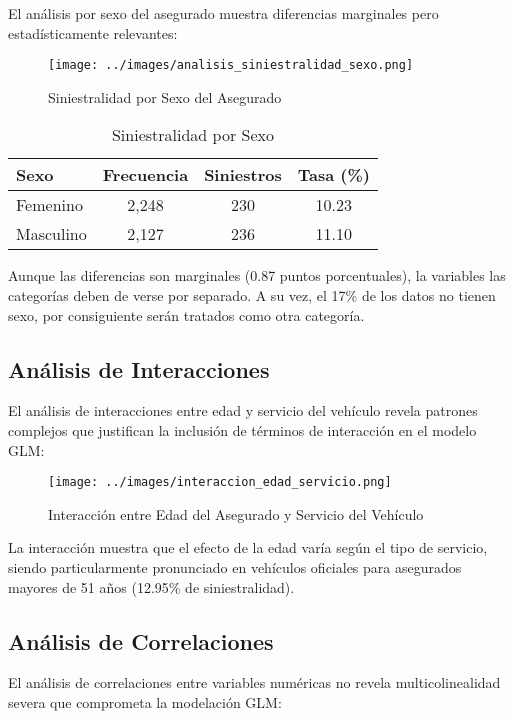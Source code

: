 El análisis por sexo del asegurado muestra diferencias marginales pero estadísticamente relevantes:

\begin{figure}[H]
\centering
\texttt{[image: ../images/analisis\_siniestralidad\_sexo.png]}
\caption{Siniestralidad por Sexo del Asegurado}
\end{figure}

\begin{table}[H]
\centering
\caption{Siniestralidad por Sexo}
\begin{tabular}{|l|c|c|c|}
\hline
\textbf{Sexo} & \textbf{Frecuencia} & \textbf{Siniestros} & \textbf{Tasa (\%)} \\
\hline
Femenino & 2,248 & 230 & 10.23 \\
Masculino & 2,127 & 236 & 11.10 \\
\hline
\end{tabular}
\end{table}

Aunque las diferencias son marginales (0.87 puntos porcentuales), la variables las categorías deben de verse por separado. A su vez, el 17\% de los datos no tienen sexo, por consiguiente serán tratados como otra categoría. 

\subsection{Análisis de Interacciones}

El análisis de interacciones entre edad y servicio del vehículo revela patrones complejos que justifican la inclusión de términos de interacción en el modelo GLM:

\begin{figure}[H]
\centering
\texttt{[image: ../images/interaccion\_edad\_servicio.png]}
\caption{Interacción entre Edad del Asegurado y Servicio del Vehículo}
\end{figure}

La interacción muestra que el efecto de la edad varía según el tipo de servicio, siendo particularmente pronunciado en vehículos oficiales para asegurados mayores de 51 años (12.95\% de siniestralidad).
\subsection{Análisis de Correlaciones}

El análisis de correlaciones entre variables numéricas no revela multicolinealidad severa que comprometa la modelación GLM:

